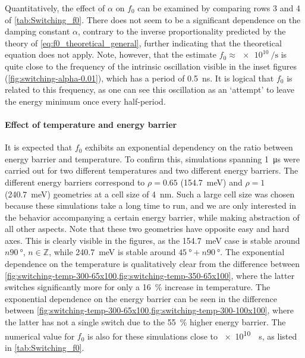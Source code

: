 \documentclass[11pt,a4paper,english,twoside]{article}
\begin{document}
Quantitatively, the effect of $\alpha$ on $f_0$ can be examined by comparing rows 3 and 4 of \cref{tab:Switching_f0}. There does not seem to be a significant dependence on the damping constant $\alpha$, contrary to the inverse proportionality predicted by the theory of \cref{eq:f0_theoretical_general}, further indicating that the theoretical equation does not apply. Note, however, that the estimate $f_0\approx\SI{e10}{\per\second}$ is quite close to the frequency of the intrinsic oscillation visible in the inset figures (\cref{fig:switching-alpha-0.01}), which has a period of \SI{0.5}{\nano\second}. It is logical that $f_0$ is related to this frequency, as one can see this oscillation as an `attempt' to leave the energy minimum once every half-period.

\FloatBarrier
\paragraph{Effect of temperature and energy barrier}
It is expected that $f_0$ exhibits an exponential dependency on the ratio between energy barrier and temperature. To confirm this, simulations spanning \SI{1}{\micro\second} were carried out for two different temperatures and two different energy barriers. The different energy barriers correspond to $\rho=0.65$ (\SI{154.7}{\milli\electronvolt}) and $\rho=1$ (\SI{240.7}{\milli\electronvolt}) geometries at a cell size of \SI{4}{\nano\metre}. Such a large cell size was chosen because these simulations take a long time to run, and we are only interested in the behavior accompanying a certain energy barrier, while making abstraction of all other aspects. Note that these two geometries have opposite easy and hard axes. This is clearly visible in the figures, as the \SI{154.7}{\milli\electronvolt} case is stable around $n\SI{90}{\degree}$, $n \in \mathbb{Z}$, while \SI{240.7}{\milli\electronvolt} is stable around $\SI{45}{\degree} + n\SI{90}{\degree}$. The exponential dependence on the temperature is qualitatively clear from the difference between \cref{fig:switching-temp-300-65x100,fig:switching-temp-350-65x100}, where the latter switches significantly more for only a \SI{16}{\percent} increase in temperature. The exponential dependence on the energy barrier can be seen in the difference between \cref{fig:switching-temp-300-65x100,fig:switching-temp-300-100x100}, where the latter has not a single switch due to the \SI{55}{\percent} higher energy barrier. The numerical value for $f_0$ is also for these simulations close to \SI{e10}{\per\second}, as listed in \cref{tab:Switching_f0}.
\end{document}
